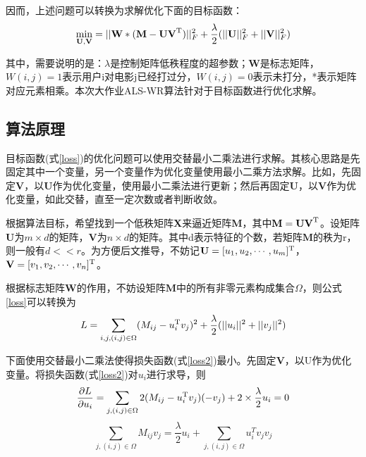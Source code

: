 \documentclass[11pt]{article}
\begin{document}
因而，上述问题可以转换为求解优化下面的目标函数：
\begin{equation}
	\underset{\textbf{U}, \textbf{V}} {\rm min} = \vert\vert \textbf{W} * (\textbf{M} - \textbf{U}\textbf{V}^{\rm T}) \vert\vert_{F}^{2} + \frac{\lambda}{2}(\vert\vert \textbf{U} \vert\vert_{F}^{2} + \vert\vert \textbf{V} \vert\vert_{F}^{2})
	\label{loss}
\end{equation}

其中，需要说明的是：$\lambda$是控制矩阵低秩程度的超参数；\textbf{W}是标志矩阵，$W(i,j) = 1$表示用户i对电影j已经打过分，$W(i,j) = 0$表示未打分，*表示矩阵对应元素相乘。本次大作业ALS-WR算法针对于目标函数进行优化求解。

\subsection{算法原理}
目标函数(式\ref{loss})的优化问题可以使用交替最小二乘法进行求解。其核心思路是先固定其中一个变量，另一个变量作为优化变量使用最小二乘方法求解。比如，先固定\textbf{V}，以\textbf{U}作为优化变量，使用最小二乘法进行更新；然后再固定\textbf{U}，以\textbf{V}作为优化变量，如此交替，直至一定次数或者判断收敛\cite{ALSWR}。

根据算法目标，希望找到一个低秩矩阵\textbf{X}来逼近矩阵\textbf{M}，其中$\textbf{M} = \textbf{U}\textbf{V}^{\rm T}$。设矩阵$\textbf{U}$为$m\times d$的矩阵，$\textbf{V}$为$n \times d$的矩阵。其中d表示特征的个数，若矩阵$\textbf{M}$的秩为r，则一般有$d << r$。为方便后文推导，不妨记$\textbf{U} = [u_1,u_2,\cdots,u_m]^{\rm T}$，$\textbf{V} = [v_1,v_2,\cdots,v_n]^{\rm T}$。

根据标志矩阵$\textbf{W}$的作用，不妨设矩阵$\textbf{M}$中的所有非零元素构成集合$\Omega$，则公式\ref{loss}可以转换为
\begin{equation}
	L = \sum_{i,j,(i,j)\in \Omega} (M_{ij} - u_{i}^{\rm T}v_{j})^2 + \frac{\lambda}{2}(\vert\vert u_{i} \vert\vert^2 + \vert\vert v_{j} \vert\vert^2)
	\label{loss2}
\end{equation}

下面使用交替最小二乘法使得损失函数(式\ref{loss2})最小。先固定\textbf{V}，以U作为优化变量。将损失函数(式\ref{loss2})对$u_{i}$进行求导，则
\begin{equation}
	\frac{\partial L}{\partial u_{i}} = \sum_{j,(i,j)\in\Omega} 2(M_{ij} - u_{i}^{\rm T}v_{j})(- v_j) + 2\times\frac{\lambda}{2}u_i  = 0
	\label{ded}
\end{equation}
\begin{equation}
	\sum_{j,(i,j)\in\Omega} M_{ij}v_j = \frac{\lambda}{2}u_i + \sum_{j,(i,j)\in\Omega} u_{i}^{T}v_{j}v_{j}
	\label{sim}
\end{equation}
\end{document}
